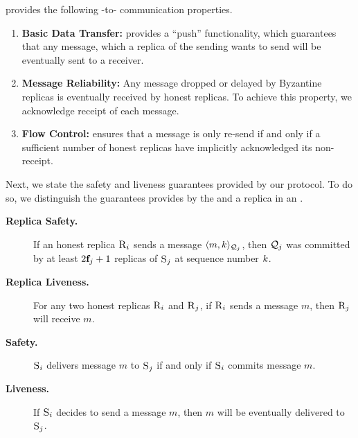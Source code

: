 \Scrooge{} provides the following \RSM{}-to-\RSM{} communication properties.
\begin{enumerate}
	\item \textbf{Basic Data Transfer:} \Scrooge{} provides a ``push'' functionality, which guarantees that any message, which a replica of the 
sending \RSM{} wants to send will be eventually sent to a receiver.
	\item \textbf{Message Reliability:} Any message dropped or delayed by Byzantine replicas is eventually received by honest replicas.
To achieve this property, we acknowledge receipt of each message.
	\item {\bf Flow Control:} \Scrooge{} ensures that a message is only re-send if and only if a sufficient number of honest replicas 
have implicitly acknowledged its non-receipt.
\end{enumerate}


Next, we state the safety and liveness guarantees provided by our \Scrooge{} protocol. 
To do so, we distinguish the guarantees provides by the \RSM{} and a replica in an \RSM{}.


\begin{description}
\item[\bf Replica Safety.] 
If an honest replica $\textsc{R}_{{i}{}}$ sends a message $\langle m, k\rangle_{\mathcal{Q}_{j}}$, 
then $\mathcal{Q}_{j}$ was committed by at least $2\textbf{f}_{j}+1$ replicas of \RSM{} $\textsc{S}_{j}$ at sequence number $k$.

\item[\bf Replica Liveness.]
For any two honest replicas $\textsc{R}_{{i}{}}$ and $\textsc{R}_{{j}{}}$,
if $\textsc{R}_{{i}{}}$ sends a message $m$, then $\textsc{R}_{{j}{}}$ will receive $m$.

\item[\bf \RSM{} Safety.]
\RSM{} $\textsc{S}_{i}$ delivers message $m$ to \RSM{} $\textsc{S}_{j}$ if and only if
$\textsc{S}_{i}$ commits message $m$.

\item[\bf \RSM{} Liveness.]
If \RSM{} $\textsc{S}_{i}$ decides to send a message $m$, then $m$ will be eventually
delivered to \RSM{} $\textsc{S}_{j}$.
\end{description}



%

